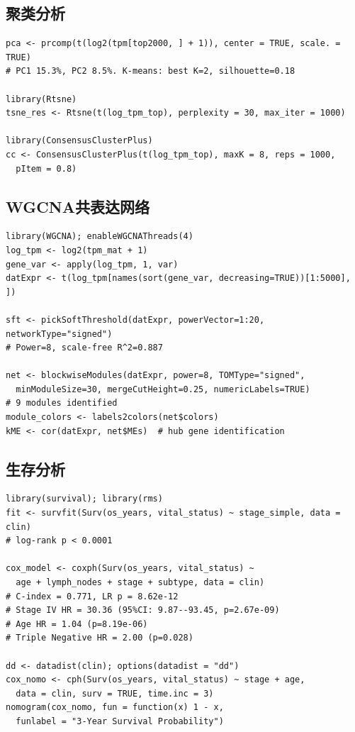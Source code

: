 \documentclass[12pt,a4paper]{ctexart}
\begin{document}
\subsection{聚类分析}
\begin{lstlisting}[caption={PCA/t-SNE/K-means/共识聚类}, basicstyle=\ttfamily\scriptsize]
pca <- prcomp(t(log2(tpm[top2000, ] + 1)), center = TRUE, scale. = TRUE)
# PC1 15.3%, PC2 8.5%. K-means: best K=2, silhouette=0.18

library(Rtsne)
tsne_res <- Rtsne(t(log_tpm_top), perplexity = 30, max_iter = 1000)

library(ConsensusClusterPlus)
cc <- ConsensusClusterPlus(t(log_tpm_top), maxK = 8, reps = 1000,
  pItem = 0.8)
\end{lstlisting}

\subsection{WGCNA共表达网络}
\begin{lstlisting}[caption={WGCNA网络构建}, basicstyle=\ttfamily\scriptsize]
library(WGCNA); enableWGCNAThreads(4)
log_tpm <- log2(tpm_mat + 1)
gene_var <- apply(log_tpm, 1, var)
datExpr <- t(log_tpm[names(sort(gene_var, decreasing=TRUE))[1:5000], ])

sft <- pickSoftThreshold(datExpr, powerVector=1:20, networkType="signed")
# Power=8, scale-free R^2=0.887

net <- blockwiseModules(datExpr, power=8, TOMType="signed",
  minModuleSize=30, mergeCutHeight=0.25, numericLabels=TRUE)
# 9 modules identified
module_colors <- labels2colors(net$colors)
kME <- cor(datExpr, net$MEs)  # hub gene identification
\end{lstlisting}

\subsection{生存分析}
\begin{lstlisting}[caption={KM/Cox/Nomogram}, basicstyle=\ttfamily\scriptsize]
library(survival); library(rms)
fit <- survfit(Surv(os_years, vital_status) ~ stage_simple, data = clin)
# log-rank p < 0.0001

cox_model <- coxph(Surv(os_years, vital_status) ~
  age + lymph_nodes + stage + subtype, data = clin)
# C-index = 0.771, LR p = 8.62e-12
# Stage IV HR = 30.36 (95%CI: 9.87--93.45, p=2.67e-09)
# Age HR = 1.04 (p=8.19e-06)
# Triple Negative HR = 2.00 (p=0.028)

dd <- datadist(clin); options(datadist = "dd")
cox_nomo <- cph(Surv(os_years, vital_status) ~ stage + age,
  data = clin, surv = TRUE, time.inc = 3)
nomogram(cox_nomo, fun = function(x) 1 - x,
  funlabel = "3-Year Survival Probability")
\end{lstlisting}
\end{document}
